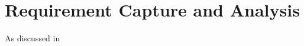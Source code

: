 \thispagestyle{plain}
\newpage
\section{Requirement Capture and Analysis}\label{sec:requirement-capture}

\normalsize

As discussed in
